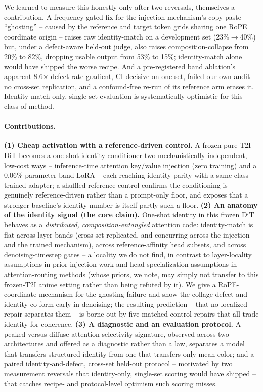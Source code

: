 We learned to measure this honestly only after two reversals, themselves
a contribution. A frequency-gated fix for the injection mechanism's
copy-paste ``ghosting'' -- caused by the reference and target token grids
sharing one RoPE coordinate origin -- raises raw identity-match on a
development set (23\%$\to$40\%) but, under a defect-aware held-out judge,
also raises composition-collapse from 20\% to 82\%, dropping usable
output from 53\% to 15\%; identity-match alone would have shipped the
worse recipe. And a pre-registered band ablation's apparent 8.6$\times$
defect-rate gradient, CI-decisive on one set, failed our own audit -- no
cross-set replication, and a confound-free re-run of its reference arm
erases it. Identity-match-only, single-set evaluation is systematically
optimistic for this class of method.

\paragraph{Contributions.}
\textbf{(1) Cheap activation with a reference-driven control.} A frozen
pure-T2I DiT becomes a one-shot identity conditioner two mechanistically
independent, low-cost ways -- inference-time attention key/value
injection (zero training) and a 0.06\%-parameter band-LoRA -- each
reaching identity parity with a same-class trained adapter; a
shuffled-reference control confirms the conditioning is genuinely
reference-driven rather than a prompt-only floor, and exposes that a
stronger baseline's identity number is itself partly such a floor.
\textbf{(2) An anatomy of the identity signal (the core claim).}
One-shot identity in this frozen DiT behaves as a \emph{distributed,
composition-entangled} attention code: identity-match is flat across
layer bands (cross-set-replicated, and concurring across the injection
and the trained mechanism), across reference-affinity head subsets, and
across denoising-timestep gates -- a locality we do not find, in contrast
to layer-locality assumptions in prior injection work
\citep{zhang2025freecus} and head-specialization assumptions in
attention-routing methods (whose priors, we note, may simply not transfer
to this frozen-T2I anime setting rather than being refuted by it). We
give a RoPE-coordinate mechanism for the ghosting failure and show the
collage defect and identity co-form early in denoising; the resulting
prediction -- that no localized repair separates them -- is borne out by
five matched-control repairs that all trade identity for coherence.
\textbf{(3) A diagnostic and an evaluation protocol.} A
peaked-versus-diffuse attention-selectivity signature, observed across
two architectures and offered as a diagnostic rather than a law,
separates a model that transfers structured identity from one that
transfers only mean color; and a paired identity-and-defect, cross-set
held-out protocol -- motivated by two measurement reversals that
identity-only, single-set scoring would have shipped -- that catches
recipe- and protocol-level optimism such scoring misses.

